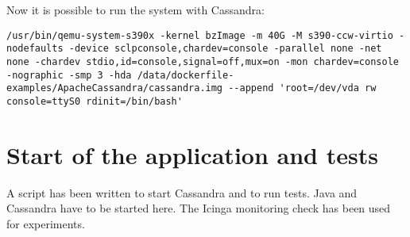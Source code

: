 Now it is possible to run the system with Cassandra: \\
\begin{lstlisting}[style=BashInputStyle]
 /usr/bin/qemu-system-s390x -kernel bzImage -m 40G -M s390-ccw-virtio -nodefaults -device sclpconsole,chardev=console -parallel none -net none -chardev stdio,id=console,signal=off,mux=on -mon chardev=console -nographic -smp 3 -hda /data/dockerfile-examples/ApacheCassandra/cassandra.img --append 'root=/dev/vda rw console=ttyS0 rdinit=/bin/bash' 
 \end{lstlisting}

\section{Start of the application and tests}

A script has been written to start Cassandra and to run tests. Java and Cassandra have to be started here. The Icinga monitoring check has been used for experiments.
